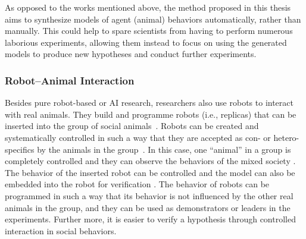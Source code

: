 As opposed to the works mentioned above, the method proposed in this thesis aims to synthesize models of agent (animal) behaviors automatically, rather than manually. This could help to spare scientists from having to perform numerous laborious experiments, allowing them instead to focus on using the generated models to produce new hypotheses and conduct further experiments. 

\subsubsection{Robot--Animal Interaction}\label{sec:robot_animal_interaction}

Besides pure robot-based or AI research, researchers also use robots to interact with real animals. They build and programme robots (i.e., replicas) that can be inserted into the group of social animals~\cite{Faria2010, Halloy2013, J.Halloy2007, Thomas2013, Vaughan2000}. Robots can be created and systematically controlled in such a way that they are accepted as con- or hetero-specifics by the animals in the group~\cite{Krause2011}. In this case, one ``animal'' in a group is completely controlled and they can observe the behaviors of the mixed society \cite{J.Halloy_2007}. The behavior of the inserted robot can be controlled and the model can also be embedded into the robot for verification \cite{Krause_2011}. The behavior of robots can be programmed in such a way that its behavior is not influenced by the other real animals in the group, and they can be used as demonstrators or leaders in the experiments. Further more, it is easier to verify a hypothesis through controlled interaction in social behaviors. 

